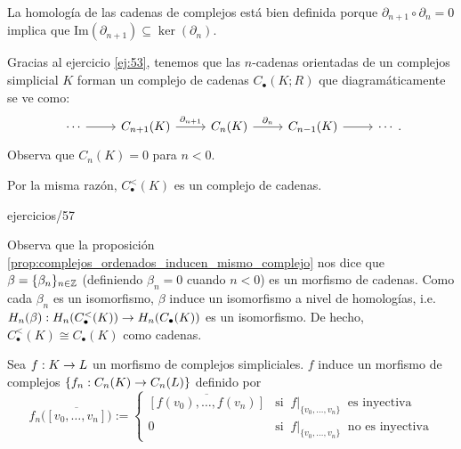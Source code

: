 \documentclass[../../topologia_algebraica]{subfiles}
\begin{document}
\begin{nota}
	La homolog\'ia de las cadenas de complejos est\'a bien definida porque $\partial_{n+1}\circ\partial_n=0$ implica
	que Im$(\partial_{n+1})\subseteq\ker(\partial_n)$.
\end{nota}

\begin{ejemplo}
	Gracias al ejercicio \ref{ej:53}, tenemos que las $n$-cadenas orientadas de un complejos simplicial $K$ forman
	un complejo de cadenas $C_{\bullet}(K;R)$ que diagram\'aticamente se ve como:
	\[
		\begin{tikzcd}
			\cdots \arrow[r] & C_{n+1}(K) \arrow[r,"\partial_{n+1}"] & C_n(K) \arrow[r,"\partial_n"] & C_{n-1}(K) \arrow[r] & \cdots
		\end{tikzcd}.
	\]
	Observa que $C_n(K)=0$ para $n<0$.

	Por la misma raz\'on, $C^<_{\bullet}(K)$ es un complejo de cadenas.
\end{ejemplo}

{ejercicios/57} %

\begin{nota}
	Observa que la proposici\'on \ref{prop:complejos_ordenados_inducen_mismo_complejo} nos dice que
	$\beta=\{\beta_n\}_{n\in\mathbb{Z}}$ (definiendo $\beta_n=0$ cuando $n<0$) es un morfismo de cadenas. Como cada
	$\beta_n$ es un isomorfismo, $\beta$ induce un isomorfismo a nivel de homolog\'ias, i.e.
	$H_n(\beta):H_n(C_{\bullet}^<(K))\rightarrow H_n(C_{\bullet}(K))$ es un isomorfismo. De hecho,
	$C_{\bullet}^<(K)\cong C_{\bullet}(K)$ como cadenas.
\end{nota}

\begin{defin}
	Sea $f:K\rightarrow L$ un morfismo de complejos simpliciales. $f$ induce un morfismo de complejos $\{f_n:C_n(K)\rightarrow C_n(L)\}$
	definido por
	\[
		f_n\big( \overline{[v_0,\ldots,v_n]} \big):=
			\begin{cases}
				\overline{[f(v_0),\ldots,f(v_n)]} & \text{si}\;\; f|_{\{v_0,\ldots,v_n\}}\;\;\text{es inyectiva}\\
				0 & \text{si}\;\; f|_{\{v_0,\ldots,v_n\}}\;\;\text{no es inyectiva}
			\end{cases}
	\]
\end{defin}
\end{document}
